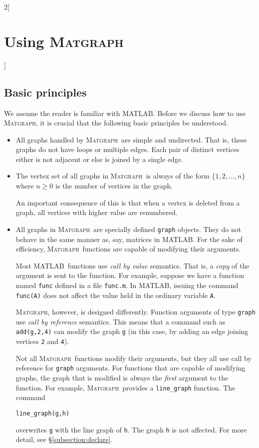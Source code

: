 \documentclass{amsart}
\newcommand\matlab{MATLAB}
\newcommand\matgraph{\textsc{Matgraph}}
\begin{document}
\begin{multicols}{2}[\section{Using \matgraph}]
\label{sect:using}


\subsection{Basic principles}
\label{subsect:basic-principles}
We assume the reader is familiar with \matlab. Before we discuss how
to use \matgraph, it is crucial that the following basic principles be
understood.
\begin{itemize}
\item All graphs handled by \matgraph\ are simple and undirected. That
  is, these graphs do not have loops or multiple edges. Each pair of
  distinct vertices either is not adjacent or else is joined by a
  single edge.

\item The vertex set of all graphs in \matgraph\ is always of the form
  $\{1,2,\ldots,n\}$ where $n\ge0$ is the number of vertices in the
  graph. 

  An important consequence of this is that when a vertex is deleted
  from a graph, all vertices with higher value are renumbered. 
  
\item All graphs in \matgraph\ are specially defined \verb|graph|
  objects. They do not behave in the same manner as, say, matrices in
  \matlab. For the sake of efficiency, \matgraph\ functions are
  capable of modifying their arguments.
  
  Most \matlab\ functions use \emph{call by value} semantics. That is,
  a \emph{copy} of the argument is sent to the function. For example,
  suppose we have a function named \verb|func| defined in a file
  \verb|func.m|. In \matlab, issuing the command \verb|func(A)| does
  not affect the value held in the ordinary variable \verb|A|.
  
  \matgraph, however, is designed differently. Function arguments of
  type \verb|graph| use \emph{call by reference} semantics. This means
  that a command such as \verb|add(g,2,4)| can modify the graph
  \verb|g| (in this case, by adding an edge joining vertices \verb|2|
  and \verb|4|).
  
  Not all \matgraph\ functions modify their arguments, but they all
  use call by reference for \verb|graph| arguments. For functions that are
  capable of modifying graphs, the graph that is modified is always the
  \emph{first} argument to the function. For example, \matgraph\
  provides a \verb|line_graph| function. The command
\begin{verbatim}
line_graph(g,h)
\end{verbatim}
  overwrites \verb|g| with the line graph of \verb|h|. The graph
  \verb|h| is not affected. For more detail, see \S\ref{subsection:declare}.


\end{itemize}
\end{multicols}
\end{document}
